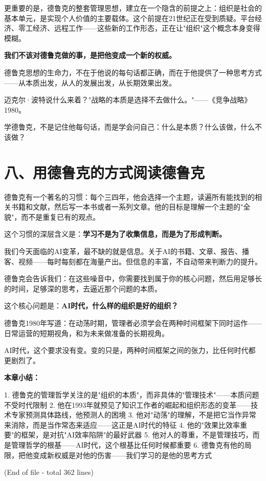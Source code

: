 更重要的是，德鲁克的整套管理思想，建立在一个隐含的前提之上：组织是社会的基本单元，是实现个人价值的主要载体。这个前提在21世纪正在受到质疑。平台经济、零工经济、远程工作——这些新的工作形态，正在让"组织"这个概念本身变得模糊。

\textbf{我们不该对德鲁克做的事，是把他变成一个新的权威。}

德鲁克思想的生命力，不在于他说的每句话都正确，而在于他提供了一种思考方式——从本质出发，从人的发展出发，从长期效果出发。

迈克尔·波特说什么来着？"战略的本质是选择不去做什么。"——《竞争战略》1980。

学德鲁克，不是记住他每句话，而是学会问自己：什么是本质？什么该做，什么不该做？


\section{八、用德鲁克的方式阅读德鲁克}


德鲁克有一个著名的习惯：每个三四年，他会选择一个主题，读遍所有能找到的相关书籍和文献，然后写一本书或者一系列文章。他的目标是理解一个主题的"全貌"，而不是重复已有的观点。

这个习惯的深层含义是：\textbf{学习不是为了收集信息，而是为了形成判断。}

我们今天面临的AI变革，最不缺的就是信息。关于AI的书籍、文章、报告、播客、视频——每时每刻都在海量产出。但信息的丰富，不自动带来判断力的提升。

德鲁克会告诉我们：在这些噪音中，你需要找到属于你的核心问题，然后用足够长的时间，足够深的思考，去逼近那个问题的本质。

这个核心问题是：\textbf{AI时代，什么样的组织是好的组织？}

德鲁克1980年写道：在动荡时期，管理者必须学会在两种时间框架下同时运作——日常运营的短期视角，和为未来做准备的长期视角。

AI时代，这个要求没有变。变的只是，两种时间框架之间的张力，比任何时代都更剧烈了。


\textbf{本章小结：}

1. 德鲁克的管理哲学关注的是"组织的本质"，而非具体的"管理技术"——本质问题不受时代限制
2. 他在1993年就预见了知识工作者的崛起和组织形态的变革——技术专家预测具体路线，他预测人的困境
3. 他对"动荡"的理解，不是把它当作异常来消除，而是当作常态来适应——这正是AI时代的特征
4. 他的"效果比效率重要"的框架，是对抗"AI效率陷阱"的最好武器
5. 他对人的尊重，不是管理技巧，而是管理哲学的根基——AI时代，这个根基比任何时候都重要
6. 德鲁克有他的局限，把他变成新权威是对他的伤害——我们学习的是他的思考方式

(End of file - total 362 lines)